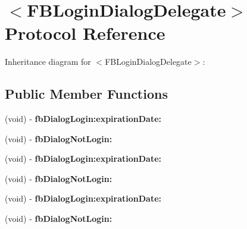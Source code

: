 \hypertarget{protocol_f_b_login_dialog_delegate-p}{
\section{$<$\-F\-B\-Login\-Dialog\-Delegate$>$ \-Protocol \-Reference}
\label{protocol_f_b_login_dialog_delegate-p}
}


\-Inheritance diagram for $<$\-F\-B\-Login\-Dialog\-Delegate$>$\-:
\subsection*{\-Public \-Member \-Functions}
\begin{DoxyCompactItemize}
\item 
\hypertarget{protocol_f_b_login_dialog_delegate-p_abc4d0728b26e963af7e14faeca22fd63}{
(void) -\/ {\bfseries fb\-Dialog\-Login\-:expiration\-Date\-:}}
\label{protocol_f_b_login_dialog_delegate-p_abc4d0728b26e963af7e14faeca22fd63}

\item 
\hypertarget{protocol_f_b_login_dialog_delegate-p_a99b3ef421a3bf8ce145089b21e88acc0}{
(void) -\/ {\bfseries fb\-Dialog\-Not\-Login\-:}}
\label{protocol_f_b_login_dialog_delegate-p_a99b3ef421a3bf8ce145089b21e88acc0}

\item 
\hypertarget{protocol_f_b_login_dialog_delegate-p_abc4d0728b26e963af7e14faeca22fd63}{
(void) -\/ {\bfseries fb\-Dialog\-Login\-:expiration\-Date\-:}}
\label{protocol_f_b_login_dialog_delegate-p_abc4d0728b26e963af7e14faeca22fd63}

\item 
\hypertarget{protocol_f_b_login_dialog_delegate-p_a99b3ef421a3bf8ce145089b21e88acc0}{
(void) -\/ {\bfseries fb\-Dialog\-Not\-Login\-:}}
\label{protocol_f_b_login_dialog_delegate-p_a99b3ef421a3bf8ce145089b21e88acc0}

\item 
\hypertarget{protocol_f_b_login_dialog_delegate-p_abc4d0728b26e963af7e14faeca22fd63}{
(void) -\/ {\bfseries fb\-Dialog\-Login\-:expiration\-Date\-:}}
\label{protocol_f_b_login_dialog_delegate-p_abc4d0728b26e963af7e14faeca22fd63}

\item 
\hypertarget{protocol_f_b_login_dialog_delegate-p_a99b3ef421a3bf8ce145089b21e88acc0}{
(void) -\/ {\bfseries fb\-Dialog\-Not\-Login\-:}}
\label{protocol_f_b_login_dialog_delegate-p_a99b3ef421a3bf8ce145089b21e88acc0}


\end{DoxyCompactItemize}
